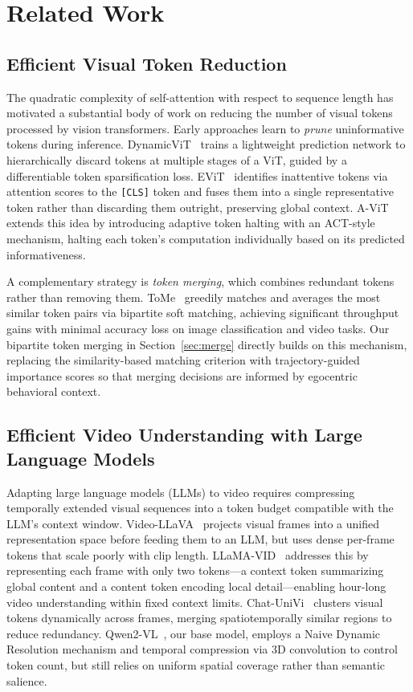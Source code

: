\section{Related Work}

\subsection{Efficient Visual Token Reduction}

The quadratic complexity of self-attention with respect to sequence length has motivated a
substantial body of work on reducing the number of visual tokens processed by vision transformers.
Early approaches learn to \emph{prune} uninformative tokens during inference.
DynamicViT~\cite{rao2021dynamicvit} trains a lightweight prediction network to hierarchically
discard tokens at multiple stages of a ViT, guided by a differentiable token sparsification loss.
EViT~\cite{liang2022evit} identifies inattentive tokens via attention scores to the
\texttt{[CLS]} token and fuses them into a single representative token rather than discarding
them outright, preserving global context.
A-ViT~\cite{yin2022avit} extends this idea by introducing adaptive token halting with an
ACT-style~\cite{graves2016act} mechanism, halting each token's computation individually based
on its predicted informativeness.

A complementary strategy is \emph{token merging}, which combines redundant tokens rather than
removing them.
ToMe~\cite{bolya2023tome} greedily matches and averages the most similar token pairs via bipartite
soft matching, achieving significant throughput gains with minimal accuracy loss on image
classification and video tasks.
Our bipartite token merging in Section~\ref{sec:merge} directly builds on this mechanism,
replacing the similarity-based matching criterion with trajectory-guided importance scores so that
merging decisions are informed by egocentric behavioral context.

\subsection{Efficient Video Understanding with Large Language Models}

Adapting large language models (LLMs) to video requires compressing temporally extended visual
sequences into a token budget compatible with the LLM's context window.
Video-LLaVA~\cite{lin2023videollava} projects visual frames into a unified representation space
before feeding them to an LLM, but uses dense per-frame tokens that scale poorly with clip length.
LLaMA-VID~\cite{li2023llamavid} addresses this by representing each frame with only two tokens—a
context token summarizing global content and a content token encoding local detail—enabling
hour-long video understanding within fixed context limits.
Chat-UniVi~\cite{jin2024chatunivi} clusters visual tokens dynamically across frames, merging
spatiotemporally similar regions to reduce redundancy.
Qwen2-VL~\cite{wang2024qwen2vl}, our base model, employs a Naive Dynamic Resolution mechanism and
temporal compression via 3D convolution to control token count, but still relies on uniform
spatial coverage rather than semantic salience.

